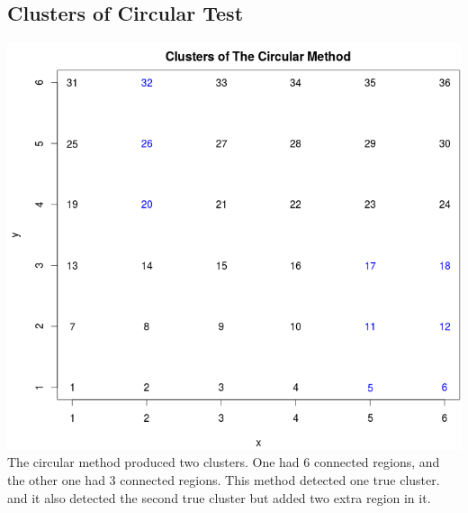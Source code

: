 \documentclass[12pt]{article}
\begin{document}
	\subsection{Clusters of Circular Test } 
	 \includegraphics[scale=0.3]{test_1} \\ The circular method produced two clusters. One had 6 connected regions, and the other one had 3 connected regions. This method detected one true cluster. and it also detected the second true cluster but added two extra region in it. \\
\end{document}
